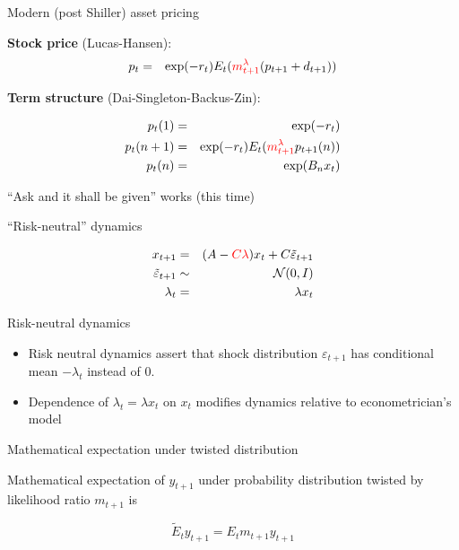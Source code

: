 \documentclass{beamer}
\theoremstyle{Definition}
\begin{document}
\begin{frame}{Modern (post Shiller) asset pricing}


\textbf{Stock price} (Lucas-Hansen):
\begin{eqnarray*}
p_t & =  &\exp(-r_t) E_t ({\color{red} m_{t+1}^\lambda} (p_{t+1} + d_{t+1})) \cr
\end{eqnarray*}


\textbf{Term structure} (Dai-Singleton-Backus-Zin):

\begin{eqnarray*}
p_t(1) &= &\exp(- r_t) \cr
p_t(n+1) & = & \exp(-r_t) E_t ({\color{red} m_{t+1}^\lambda} p_{t+1}(n)) \cr
p_t(n) & = & \exp(B_n x_t)
\end{eqnarray*}

``Ask and it shall be given'' works (this time)
\end{frame}


\begin{frame}{``Risk-neutral'' dynamics}





\begin{eqnarray*}
x_{t+1}  & = & (A - {\color{red} C  \lambda}) x_t + C \tilde \varepsilon_{t+1} \cr
\tilde \varepsilon_{t+1} & \sim & {\mathcal N}(0,I) \cr
\lambda_t & = & \lambda x_t
\end{eqnarray*}

\end{frame}

\begin{frame}{Risk-neutral  dynamics}


\begin{itemize}
\item
Risk neutral dynamics assert that  shock distribution $\varepsilon_{t+1}$
has conditional mean $ - \lambda_t  $
instead of
$ 0 $.
\item Dependence of $\lambda_t = \lambda x_t $ on  $x_t$ modifies dynamics relative to  econometrician's  model
\end{itemize}

\end{frame}


\begin{frame}{Mathematical expectation under twisted distribution}

Mathematical expectation  of  $y_{t+1}$ under probability distribution twisted by likelihood ratio $m_{t+1}$
is

$$ \tilde E_t y_{t+1} = E_t m_{t+1} y_{t+1}$$


\end{frame}
\end{document}
